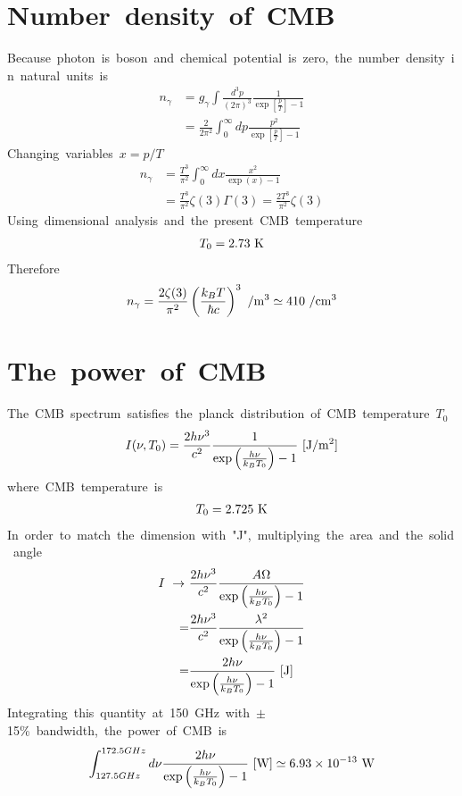 \section{Number\ density\ of\ CMB}
Because\ photon\ is\ boson\ and\ chemical\ potential\ is\ zero,\ the\ number\ density\ in\ natural\ units\ is
\begin{align*}
    n_{\gamma}&=g_{\gamma}\int\frac{d^3p}{(2\pi)^3}\frac{1}{\exp\left[\frac{p}{T}\right]-1}\\
    &=\frac{2}{2\pi^2}\int^{\infty}_0dp\frac{p^2}{\exp\left[\frac{p}{T}\right]-1}
\end{align*}
Changing\ variables\ $x=p/T$
\begin{align*}
    n_{\gamma}&=\frac{T^3}{\pi^2}\int^{\infty}_0dx\frac{x^2}{\exp(x)-1}\\
    &=\frac{T^3}{\pi^2}\zeta(3)\Gamma(3)=\frac{2T^3}{\pi^2}\zeta(3)
\end{align*}
Using\ dimensional\ analysis\ and\ the\ present\ CMB\ temperature
\begin{align*}
    T_0=2.73\ \rm{K}
\end{align*}
Therefore
\begin{align}
    n_{\gamma}=\frac{2\zeta(3)}{\pi^2}\left(\frac{k_BT}{\hbar c}\right)^3\ \rm{/m^3}\simeq410\ \rm{/cm^3}
\end{align}

\section{The\ power\ of\ CMB}
The\ CMB\ spectrum\ satisfies\ the\ planck\ distribution\ of\ CMB\ temperature\ $T_0$
\begin{align*}
    I(\nu,T_0)=\frac{2h\nu^3}{c^2}\frac{1}{\exp\left(\frac{h\nu}{k_BT_0}\right)-1}\ [\rm{J/m^2}]
\end{align*}
where\ CMB\ temperature\ is
\begin{align*}
    T_0=2.725\ \rm{K}
\end{align*}
In\ order\ to\ match\ the\ dimension\ with\ "J",\ multiplying\ the\ area\ and\ the\ solid\ angle
\begin{align*}
    I\ \to\ &\frac{2h\nu^3}{c^2}\frac{A\Omega}{\exp\left(\frac{h\nu}{k_BT_0}\right)-1}\\
    =&\frac{2h\nu^3}{c^2}\frac{\lambda^2}{\exp\left(\frac{h\nu}{k_BT_0}\right)-1}\\
    =&\frac{2h\nu}{\exp\left(\frac{h\nu}{k_BT_0}\right)-1}\ [\rm{J}]
\end{align*}
Integrating\ this\ quantity\ at\ 150\ GHz\ with\ $\pm$15\%\ bandwidth,\ the\ power\ of\ CMB\ is
\begin{align}
    \int^{172.5GHz}_{127.5GHz}d\nu\frac{2h\nu}{\exp\left(\frac{h\nu}{k_BT_0}\right)-1}\ [\rm{W}]\simeq6.93\times10^{-13}\ W
\end{align}

